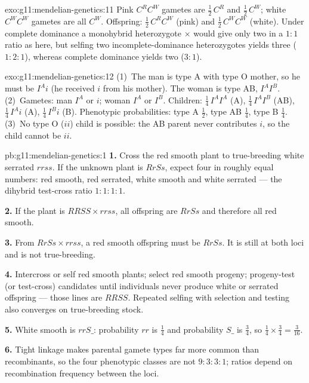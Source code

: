 \begin{solution}{exo:g11:mendelian-genetics:11}
Pink $C^{R}C^{W}$ gametes are $\tfrac12\,C^{R}$ and $\tfrac12\,C^{W}$; white
$C^{W}C^{W}$ gametes are all $C^{W}$. Offspring: $\tfrac12\,C^{R}C^{W}$ (pink)
and $\tfrac12\,C^{W}C^{W}$ (white). Under complete dominance a monohybrid
heterozygote $\times$  would give only two  in a $1:1$ ratio
as here, but selfing two incomplete-dominance heterozygotes yields three
 ($1:2:1$), whereas complete dominance yields two ($3:1$).
\end{solution}

\begin{solution}{exo:g11:mendelian-genetics:12}
(1)~The man is type A with type O mother, so he must be $I^{A}i$ (he received
$i$ from his mother). The woman is type AB,  $I^{A}I^{B}$.
(2)~Gametes: man $I^{A}$ or $i$; woman $I^{A}$ or $I^{B}$. Children:
$\tfrac14\,I^{A}I^{A}$ (A), $\tfrac14\,I^{A}I^{B}$ (AB), $\tfrac14\,I^{A}i$ (A),
$\tfrac14\,I^{B}i$ (B). Phenotypic probabilities: type A $\tfrac12$, type AB
$\tfrac14$, type B $\tfrac14$.
(3)~No type O ($ii$) child is possible: the AB parent never contributes $i$, so
the child cannot be $ii$.
\end{solution}

\begin{solution}{pb:g11:mendelian-genetics:1}
\textbf{1.} Cross the red smooth plant to true-breeding white serrated
$rrss$. If the unknown plant is $RrSs$, expect four  in roughly equal
numbers: red smooth, red serrated, white smooth and white serrated --- the
dihybrid test-cross ratio $1:1:1:1$.

\textbf{2.} If the plant is $RRSS \times rrss$, all offspring are $RrSs$ and
therefore all red smooth.

\textbf{3.} From $RrSs \times rrss$, a red smooth offspring must be $RrSs$. It
is still  at both loci and is not true-breeding.

\textbf{4.} Intercross or self red smooth plants; select red smooth progeny;
progeny-test (or test-cross) candidates until individuals never produce white
or serrated offspring --- those lines are $RRSS$. Repeated selfing with selection
and testing also converges on true-breeding stock.

\textbf{5.} White smooth is $rrS\_$: probability $rr$ is $\tfrac14$ and
probability $S\_$ is $\tfrac34$, so $\tfrac14\times\tfrac34=\tfrac3{16}$.

\textbf{6.} Tight linkage makes parental gamete types far more common than
recombinants, so the four phenotypic classes are not $9:3:3:1$; ratios depend
on recombination frequency between the loci.
\end{solution}
